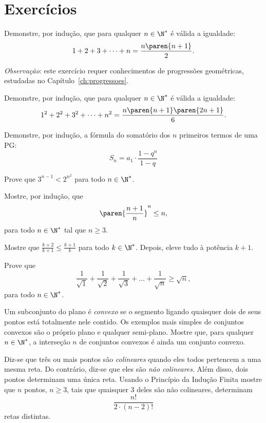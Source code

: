 \section{Exercícios}

\begin{exercise}
Demonstre, por indução, que para qualquer $n \in \N^*$ é válida a igualdade:
$$1+2+ 3+ \dots + n = \frac{n \paren {n+1}} 2.$$
\end{exercise}

\begin{exercise}
\textit{Observação}: este exercício requer conhecimentos de progressões geométricas,
estudadas no Capítulo~\ref{ch:progressoes}.

Demonstre, por indução, que para qualquer $n \in \N^*$ é
válida a igualdade:
$$1^2 +2^2 + 3^2+ \dots + n^2 = \frac{n \paren {n+1} \paren{2n+1}} 6.$$
\end{exercise}

\begin{exercise}
	Demonstre, por indução, a fórmula do somatório dos $n$ primeiros termos de uma PG:
	\[S_n = a_1 \cdot \frac{1-q^n}{1-q}\]
\end{exercise}

\begin{exercise}
Prove que $3^{n-1} < 2^{n^2}$ para todo $n \in \N^*$.
\end{exercise}

\begin{exercise}
Mostre, por indução, que
$$\paren{\frac {n+1}{n}}^n \leq n,$$
para todo $n \in \N^*$ tal que $n \geq 3$.

\begin{hint}
Mostre que $\frac{k+2}{k+1} \leq \frac{k+1} k$ para todo $k \in
\N^*$. Depois, eleve tudo à potência $k+1$.
\end{hint}
\end{exercise}

\begin{exercise}
Prove que
$$\frac 1 {\sqrt 1} +\frac 1 {\sqrt 2} +\frac 1 {\sqrt 3} + \dots + \frac 1 {\sqrt n} \geq \sqrt n,$$
para todo $ n \in \N^*$.
\end{exercise}

\begin{exercise}
Um subconjunto do plano é \emph{convexo} se o segmento ligando quaisquer dois de seus pontos está totalmente nele contido.
Os exemplos mais simples de conjuntos convexos são o próprio plano e qualquer semi-plano.
Mostre que, para qualquer $n \in \N^*$, a interseção $n$ de conjuntos convexos é ainda um conjunto convexo.
\end{exercise}

\begin{exercise}
Diz-se que três ou mais pontos são \emph{colineares} quando eles todos pertencem a uma mesma reta.
Do contrário, diz-se que eles são \emph{não colineares}.
Além disso, dois pontos determinam uma única reta.
Usando o Princípio da Indução Finita mostre que $n$ pontos, $n\geq 3$, tais que quaisquer 3 deles são não colineares, determinam
$$\frac{n!}{2\cdot(n-2)!}$$
retas distintas.
\end{exercise}